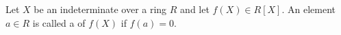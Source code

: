 Let $X$ be an indeterminate over a ring $R$ and let $f(X) \in R[X]$. An element $a \in R$ is called a  of $f(X)$ if $f(a) = 0$.
